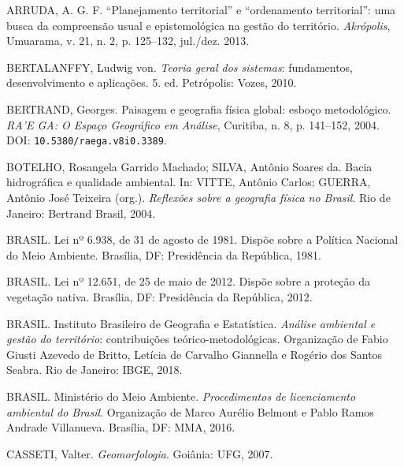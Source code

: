 \begin{list}{}{%
  \setlength{\leftmargin}{1.6em}%
  \setlength{\itemindent}{-1.6em}%
  \setlength{\itemsep}{4.5pt}%
  \setlength{\parsep}{0pt}%
  \setlength{\topsep}{4pt}%
}
\small
  \item ARRUDA, A. G. F. ``Planejamento territorial'' e ``ordenamento territorial'': uma busca da compreensão usual e epistemológica na gestão do território. \textit{Akrópolis}, Umuarama, v. 21, n. 2, p. 125--132, jul./dez. 2013.

  \item BERTALANFFY, Ludwig von. \textit{Teoria geral dos sistemas}: fundamentos, desenvolvimento e aplicações. 5. ed. Petrópolis: Vozes, 2010.

  \item BERTRAND, Georges. Paisagem e geografia física global: esboço metodológico. \textit{RA'E GA: O Espaço Geográfico em Análise}, Curitiba, n. 8, p. 141--152, 2004. DOI: \texttt{10.5380/raega.v8i0.3389}.

  \item BOTELHO, Rosangela Garrido Machado; SILVA, Antônio Soares da. Bacia hidrográfica e qualidade ambiental. In: VITTE, Antônio Carlos; GUERRA, Antônio José Teixeira (org.). \textit{Reflexões sobre a geografia física no Brasil}. Rio de Janeiro: Bertrand Brasil, 2004.

  \item BRASIL. Lei nº 6.938, de 31 de agosto de 1981. Dispõe sobre a Política Nacional do Meio Ambiente. Brasília, DF: Presidência da República, 1981.

  \item BRASIL. Lei nº 12.651, de 25 de maio de 2012. Dispõe sobre a proteção da vegetação nativa. Brasília, DF: Presidência da República, 2012.

  \item BRASIL. Instituto Brasileiro de Geografia e Estatística. \textit{Análise ambiental e gestão do território}: contribuições teórico-metodológicas. Organização de Fabio Giusti Azevedo de Britto, Letícia de Carvalho Giannella e Rogério dos Santos Seabra. Rio de Janeiro: IBGE, 2018.

  \item BRASIL. Ministério do Meio Ambiente. \textit{Procedimentos de licenciamento ambiental do Brasil}. Organização de Marco Aurélio Belmont e Pablo Ramos Andrade Villanueva. Brasília, DF: MMA, 2016.

  \item CASSETI, Valter. \textit{Geomorfologia}. Goiânia: UFG, 2007.


\end{list}
